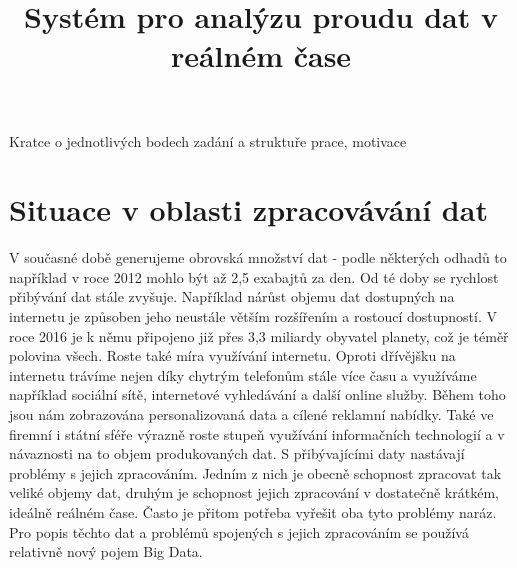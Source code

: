 \documentclass[thesis=B,czech]{FITthesis}[2012/06/26]
\title{Systém pro analýzu proudu dat v reálném čase}
\begin{document}

\begin{introduction}
	Kratce o jednotlivých bodech zadání a struktuře prace, motivace
	
\end{introduction}

%


\chapter{Situace v oblasti zpracovávání dat}
	V současné době generujeme obrovská množství dat - podle některých odhadů to například v roce 2012 mohlo být až 2,5 exabajtů za den\cite{bbc-bigdata}. Od té doby se rychlost přibývání dat stále zvyšuje. Například nárůst objemu dat dostupných na internetu je způsoben jeho neustále větším rozšířením a rostoucí dostupností. V  roce 2016 je k němu připojeno již přes 3,3 miliardy obyvatel planety\cite{internet-live-stats}, což je téměř polovina všech. Roste také míra využívání internetu. Oproti dřívějšku na internetu trávíme nejen díky chytrým telefonům stále více času a využíváme například sociální sítě, internetové vyhledávání a další online služby. Během toho jsou nám zobrazována personalizovaná data a cílené reklamní nabídky. Také ve firemní i státní sféře výrazně roste stupeň využívání informačních technologií a v návaznosti na to objem produkovaných dat. S přibývajícími daty nastávají problémy s jejich zpracováním. Jedním z nich je obecně schopnost zpracovat tak veliké objemy dat, druhým je schopnost jejich zpracování v dostatečně krátkém, ideálně reálném čase. Často je přitom potřeba vyřešit oba tyto problémy naráz. Pro popis těchto dat a problémů spojených s jejich zpracováním se používá relativně nový pojem Big Data. 

		 
\end{document}
